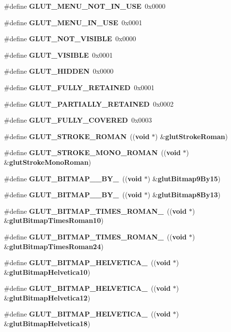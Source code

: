 \begin{DoxyCompactItemize}
\item 
\#define {\bf G\+L\+U\+T\+\_\+\+M\+E\+N\+U\+\_\+\+N\+O\+T\+\_\+\+I\+N\+\_\+\+U\+S\+E}~0x0000
\item 
\#define {\bf G\+L\+U\+T\+\_\+\+M\+E\+N\+U\+\_\+\+I\+N\+\_\+\+U\+S\+E}~0x0001
\item 
\#define {\bf G\+L\+U\+T\+\_\+\+N\+O\+T\+\_\+\+V\+I\+S\+I\+B\+L\+E}~0x0000
\item 
\#define {\bf G\+L\+U\+T\+\_\+\+V\+I\+S\+I\+B\+L\+E}~0x0001
\item 
\#define {\bf G\+L\+U\+T\+\_\+\+H\+I\+D\+D\+E\+N}~0x0000
\item 
\#define {\bf G\+L\+U\+T\+\_\+\+F\+U\+L\+L\+Y\+\_\+\+R\+E\+T\+A\+I\+N\+E\+D}~0x0001
\item 
\#define {\bf G\+L\+U\+T\+\_\+\+P\+A\+R\+T\+I\+A\+L\+L\+Y\+\_\+\+R\+E\+T\+A\+I\+N\+E\+D}~0x0002
\item 
\#define {\bf G\+L\+U\+T\+\_\+\+F\+U\+L\+L\+Y\+\_\+\+C\+O\+V\+E\+R\+E\+D}~0x0003
\item 
\#define {\bf G\+L\+U\+T\+\_\+\+S\+T\+R\+O\+K\+E\+\_\+\+R\+O\+M\+A\+N}~(({\bf void} $\ast$) \&{\bf glut\+Stroke\+Roman})
\item 
\#define {\bf G\+L\+U\+T\+\_\+\+S\+T\+R\+O\+K\+E\+\_\+\+M\+O\+N\+O\+\_\+\+R\+O\+M\+A\+N}~(({\bf void} $\ast$) \&{\bf glut\+Stroke\+Mono\+Roman})
\item 
\#define {\bf G\+L\+U\+T\+\_\+\+B\+I\+T\+M\+A\+P\+\_\+\_\+\+B\+Y\+\_}~(({\bf void} $\ast$) \&{\bf glut\+Bitmap9\+By15})
\item 
\#define {\bf G\+L\+U\+T\+\_\+\+B\+I\+T\+M\+A\+P\+\_\+\_\+\+B\+Y\+\_}~(({\bf void} $\ast$) \&{\bf glut\+Bitmap8\+By13})
\item 
\#define {\bf G\+L\+U\+T\+\_\+\+B\+I\+T\+M\+A\+P\+\_\+\+T\+I\+M\+E\+S\+\_\+\+R\+O\+M\+A\+N\+\_}~(({\bf void} $\ast$) \&{\bf glut\+Bitmap\+Times\+Roman10})
\item 
\#define {\bf G\+L\+U\+T\+\_\+\+B\+I\+T\+M\+A\+P\+\_\+\+T\+I\+M\+E\+S\+\_\+\+R\+O\+M\+A\+N\+\_}~(({\bf void} $\ast$) \&{\bf glut\+Bitmap\+Times\+Roman24})
\item 
\#define {\bf G\+L\+U\+T\+\_\+\+B\+I\+T\+M\+A\+P\+\_\+\+H\+E\+L\+V\+E\+T\+I\+C\+A\+\_}~(({\bf void} $\ast$) \&{\bf glut\+Bitmap\+Helvetica10})
\item 
\#define {\bf G\+L\+U\+T\+\_\+\+B\+I\+T\+M\+A\+P\+\_\+\+H\+E\+L\+V\+E\+T\+I\+C\+A\+\_}~(({\bf void} $\ast$) \&{\bf glut\+Bitmap\+Helvetica12})
\item 
\#define {\bf G\+L\+U\+T\+\_\+\+B\+I\+T\+M\+A\+P\+\_\+\+H\+E\+L\+V\+E\+T\+I\+C\+A\+\_}~(({\bf void} $\ast$) \&{\bf glut\+Bitmap\+Helvetica18})

\end{DoxyCompactItemize}
